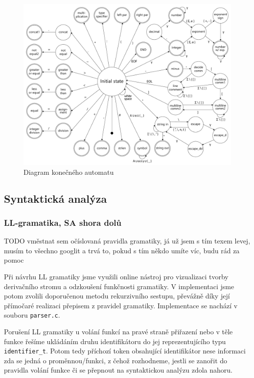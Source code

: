 \documentclass[11pt,a4paper]{article}
\begin{document}
        \begin{figure}[H]
        \includegraphics[width=\linewidth]{images/FSM_v11.pdf}
        \caption{Diagram konečného automatu}
        \label{fig:fsm-diagram}
        \end{figure}
    \subsection{Syntaktická analýza}
        \subsubsection{LL-gramatika, SA shora dolů}
        \begin{multicols}{2}
        
        TODO vměstnat sem očíslovaná pravidla gramatiky, já už jsem s tím texem levej, musím to všechno googlit a trvá to, pokud s tím někdo umíte víc, budu rád za pomoc
        \end{multicols}
        Při návrhu LL gramatiky jsme využili online nástroj\cite{LL-grammar-simulator} pro  vizualizaci tvorby derivačního stromu a odzkoušení funkčnosti gramatiky. V implementaci jsme potom zvolili doporučenou metodu rekurzivního sestupu, převážně díky její přímočaré realizaci přepisem z pravidel gramatiky. Implementace se nachází v souboru \texttt{parser.c}.
        
        Porušení LL gramatiky u volání funkcí na pravé straně přiřazení nebo v těle funkce řešíme ukládáním druhu identifikátoru do jej reprezentujícího typu \texttt{identifier\_t}. Potom tedy příchozí token obsahující identifikátor nese informaci zda se jedná o proměnnou/funkci, z čehož rozhodneme, jestli se zanořit do pravidla volání funkce či se přepnout na syntaktickou analýzu zdola nahoru.
        
\end{document}
